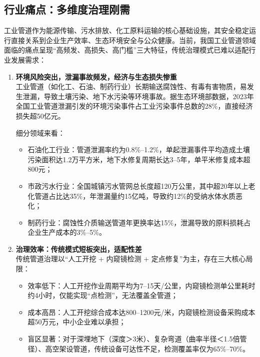 \documentclass[12pt, a4paper]{article}
\begin{document}
\subsection{行业痛点：多维度治理刚需}
工业管道作为能源传输、污水排放、化工原料运输的核心基础设施，其安全稳定运行直接关系到企业生产效率、生态环境安全与公众健康。当前，我国工业管道领域面临的痛点呈现“高频发、高损失、高门槛”三大特征，传统治理模式已难以适配行业发展需求：

\begin{enumerate}
  \item \textbf{环境风险突出，泄漏事故频发，经济与生态损失惨重}\\
  工业管道（如化工、石油、制药行业）长期输送腐蚀性、有毒有害物质，易发生泄漏，导致土壤污染、地下水污染等环境事故。据生态环境部数据，2023年全国工业管道泄漏引发的环境污染事件占工业污染事件总数的28\%，直接经济损失超50亿元。

  细分领域来看：
  \begin{itemize}
    \item 石油化工行业：管道泄漏率约为0.8\%--1.2\%，单起泄漏事件平均造成土壤污染面积达1.2万平方米，地下水修复周期长达3--5年，单平米修复成本超800元；
    \item 市政污水行业：全国城镇污水管网总长度超120万公里，其中超20年以上老化管道占比达35\%，年泄漏量约15亿吨，导致约12\%的受纳水体水质恶化；
    \item 制药行业：腐蚀性介质输送管道年更换率达15\%，泄漏导致的原料损耗占企业生产成本的3\%--5\%。
  \end{itemize}

  \item \textbf{治理效率：传统模式短板突出，适配性差}\\
  传统管道治理以“人工开挖 + 内窥镜检测 + 定点修复”为主，存在三大核心局限：
  \begin{itemize}
    \item 效率低下：人工开挖作业周期平均为7--15天/公里，内窥镜检测单公里耗时约4小时，仅能实现“点检测”，无法覆盖全管道；
    \item 成本高昂：人工开挖综合成本达800--1200元/米，内窥镜检测设备采购成本超50万元，中小企业难以承担；
    \item 盲区显著：对于深埋地下（深度＞3米）、复杂弯道（曲率半径＜1.5倍管径）、高空架设管道，传统设备可达性不足，检测覆盖率仅为65\%--70\%。
  \end{itemize}


\end{enumerate}
\end{document}
